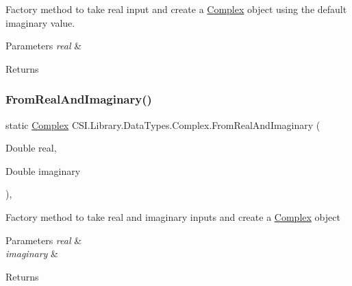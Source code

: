 Factory method to take real input and create a \mbox{\hyperlink{struct_c_s_i_1_1_library_1_1_data_types_1_1_complex}{Complex}} object using the default imaginary value. 


\begin{DoxyParams}{Parameters}
{\em real} & \\
\hline
\end{DoxyParams}
\begin{DoxyReturn}{Returns}

\end{DoxyReturn}
\mbox{\label{struct_c_s_i_1_1_library_1_1_data_types_1_1_complex_a0d9aa503483d772359f287456ab59a5e}} 
\subsubsection{\texorpdfstring{FromRealAndImaginary()}{FromRealAndImaginary()}}
{\footnotesize\ttfamily static \mbox{\hyperlink{struct_c_s_i_1_1_library_1_1_data_types_1_1_complex}{Complex}} C\+S\+I.\+Library.\+Data\+Types.\+Complex.\+From\+Real\+And\+Imaginary (\begin{DoxyParamCaption}\item[{Double}]{real,  }\item[{Double}]{imaginary }\end{DoxyParamCaption})\hspace{0.3cm}{\ttfamily [inline]}, {\ttfamily [static]}}



Factory method to take real and imaginary inputs and create a \mbox{\hyperlink{struct_c_s_i_1_1_library_1_1_data_types_1_1_complex}{Complex}} object 


\begin{DoxyParams}{Parameters}
{\em real} & \\
\hline
{\em imaginary} & \\
\hline
\end{DoxyParams}
\begin{DoxyReturn}{Returns}

\end{DoxyReturn}
\mbox{\label{struct_c_s_i_1_1_library_1_1_data_types_1_1_complex_a4a47bbe93af39f283e01a2f4f2b2a326}} 
